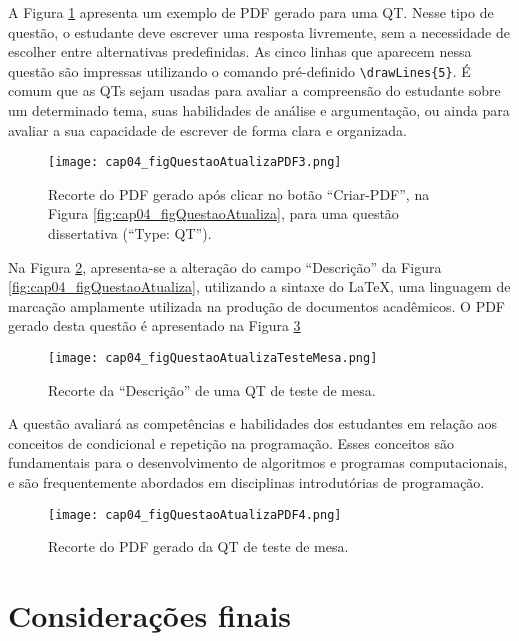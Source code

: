 A Figura \ref{fig:cap04_figQuestaoAtualizaPDF3} apresenta um exemplo de PDF gerado para uma QT. Nesse tipo de questão, o estudante deve escrever uma resposta livremente, sem a necessidade de escolher entre alternativas predefinidas. As cinco linhas que aparecem nessa questão são impressas utilizando o comando pré-definido \verb|\drawLines{5}|. É comum que as QTs sejam usadas para avaliar a compreensão do estudante sobre um determinado tema, suas habilidades de análise e argumentação, ou ainda para avaliar a sua capacidade de escrever de forma clara e organizada.

\begin{figure}[!ht]
  \texttt{[image: cap04\_figQuestaoAtualizaPDF3.png]}
  \caption{Recorte do PDF gerado após clicar no botão ``Criar-PDF'', na Figura \ref{fig:cap04_figQuestaoAtualiza}, para uma questão dissertativa (``Type: QT'').}
  \label{fig:cap04_figQuestaoAtualizaPDF3}
\end{figure}

Na Figura \ref{fig:cap04_figQuestaoAtualizaTesteMesa}, apresenta-se a alteração do campo ``Descrição'' da Figura \ref{fig:cap04_figQuestaoAtualiza}, utilizando a sintaxe do \LaTeX, uma linguagem de marcação amplamente utilizada na produção de documentos acadêmicos. O PDF gerado desta questão é apresentado na Figura \ref{fig:cap04_figQuestaoAtualizaPDF4}

\begin{figure}[!ht]
  \texttt{[image: cap04\_figQuestaoAtualizaTesteMesa.png]}
  \caption{Recorte da ``Descrição'' de uma QT de teste de mesa.}
  \label{fig:cap04_figQuestaoAtualizaTesteMesa}
\end{figure}

A questão avaliará as competências e habilidades dos estudantes em relação aos conceitos de condicional e repetição na programação. Esses conceitos são fundamentais para o desenvolvimento de algoritmos e programas computacionais, e são frequentemente abordados em disciplinas introdutórias de programação.


\begin{figure}[!ht]
  \texttt{[image: cap04\_figQuestaoAtualizaPDF4.png]}
  \caption{Recorte do PDF gerado da QT de teste de mesa.}
  \label{fig:cap04_figQuestaoAtualizaPDF4}
\end{figure}

\section{Considerações finais}

